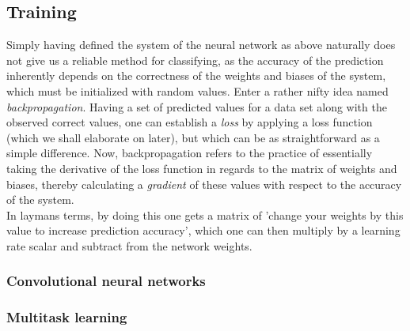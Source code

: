 \subsection*{Training}
Simply having defined the system of the neural network as above naturally does not give us a reliable method for classifying, as the accuracy of the prediction inherently depends on the correctness of the weights and biases of the system, which must be initialized with random values. 
Enter a rather nifty idea named \textit{backpropagation}. Having a set of predicted values for a data set along with the observed correct values, one can establish a \textit{loss} by applying a loss function (which we shall elaborate on later), but which can be as straightforward as a simple difference. Now, backpropagation refers to the practice of essentially taking the derivative of the loss function in regards to the matrix of weights and biases, thereby calculating a \textit{gradient} of these values with respect to the accuracy of the system.\\
In laymans terms, by doing this one gets a matrix of 'change your weights by this value to increase prediction accuracy', which one can then multiply by a learning rate scalar and subtract from the network weights.
%

\subsubsection{Convolutional neural networks}
\subsubsection{Multitask learning}